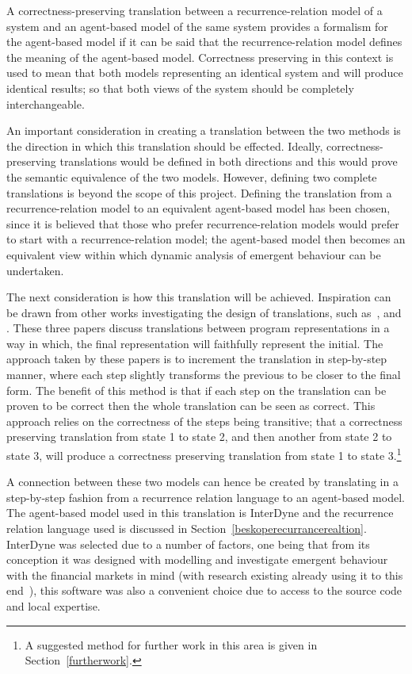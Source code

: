 \documentclass{article}
\begin{document}
A correctness-preserving translation between a recurrence-relation model of a system and an agent-based model of the same system provides a formalism for the agent-based model if it can be said that the recurrence-relation model defines the meaning of the agent-based model. Correctness preserving in this context is used to mean that both models representing an identical system and will produce identical results; so that both views of the system should be completely interchangeable. 

An important consideration in creating a translation between the two methods is the direction in which this translation should be effected. Ideally, correctness-preserving translations would be defined in both directions and this would prove the semantic equivalence of the two models.  However, defining two complete translations is beyond the scope of this project.  Defining the translation from a recurrence-relation model to an equivalent agent-based model has been chosen, since it is believed that those who prefer recurrence-relation models would prefer to start with a recurrence-relation model; the agent-based model then becomes an equivalent view within which dynamic analysis of emergent behaviour can be undertaken.

The next consideration is how this translation will be achieved. Inspiration can be drawn from other works investigating the design of translations, such as~\cite{clovertrans},  \cite{transproggotmod} and  \cite{stepcorentconv}. These three papers discuss translations between program representations in a way in which, the final representation will faithfully represent the initial. The approach taken by these papers is to increment the translation in step-by-step manner, where each step slightly transforms the previous to be closer to the final form. The benefit of this method is that if each step on the translation can be proven to be correct then the whole translation can be seen as correct. This approach relies on the correctness of the steps being transitive; that a correctness preserving translation from state 1 to state 2, and then another from state 2 to state 3, will produce a correctness preserving translation from state 1 to state 3.\footnote{A suggested method for further work in this area is given in Section~\ref{furtherwork}.} 

A connection between these two models can hence be created by translating in a step-by-step fashion from a recurrence relation language to an agent-based model. The agent-based model used in this translation is InterDyne and the recurrence relation language used is discussed in Section~\ref{beskoperecurrancerealtion}. InterDyne was selected due to a number of factors, one being that from its conception it was designed with modelling and investigate emergent behaviour with the financial markets in mind (with research existing already using it to this end~\cite{DynamicCoupling_Chris}), this software was also a convenient choice due to access to the source code and local expertise.
\end{document}
